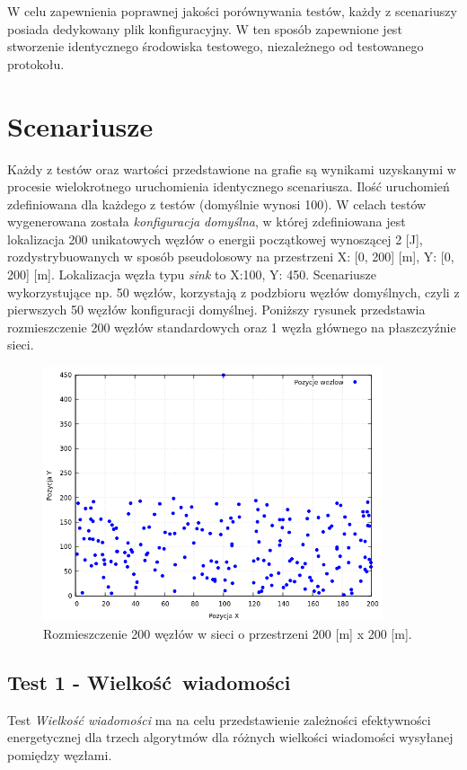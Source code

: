 \documentclass[a4paper,12pt,twoside,openany]{report}
\begin{document}
W celu zapewnienia poprawnej jakości porównywania testów, każdy z scenariuszy posiada dedykowany plik konfiguracyjny.
W ten sposób zapewnione jest stworzenie identycznego środowiska testowego, niezależnego od testowanego protokołu.

\section{Scenariusze}

Każdy z testów oraz wartości przedstawione na grafie są wynikami uzyskanymi w procesie wielokrotnego uruchomienia identycznego scenariusza. 
Ilość uruchomień zdefiniowana dla każdego z testów (domyślnie wynosi 100).
W celach testów wygenerowana została \textit{konfiguracja domyślna}, w której zdefiniowana jest lokalizacja 200 unikatowych węzłów o energii początkowej wynoszącej 2 [J], 
rozdystrybuowanych w sposób pseudolosowy na przestrzeni X: [0, 200] [m], Y: [0, 200] [m]. Lokalizacja węzła typu \textit{sink} to X:100, Y: 450.
Scenariusze wykorzystujące np. 50 węzłów, korzystają z podzbioru węzłów domyślnych, czyli z pierwszych 50 węzłów konfiguracji domyślnej.
Poniższy rysunek przedstawia rozmieszczenie 200 węzłów standardowych oraz 1 węzła głównego na płaszczyźnie sieci.

\begin{figure}[H]
 \centering
 \includegraphics[width=10cm]{images/scenariusz_lokalizacja.png}
 \caption{Rozmieszczenie 200 węzłów w sieci o przestrzeni 200 [m] x 200 [m].}
\end{figure}

\subsection{Test 1 - Wielkość wiadomości}

Test \textit{Wielkość wiadomości} ma na celu przedstawienie zależności efektywności energetycznej dla trzech algorytmów dla różnych wielkości wiadomości wysyłanej pomiędzy węzłami.
\end{document}
